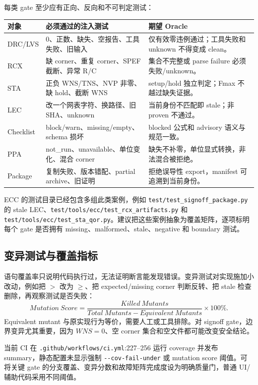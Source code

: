 \documentclass[UTF8,a4paper,11pt,fontset=fandol]{ctexart}
\numberwithin{equation}{section}
\newcommand{\code}[1]{\nolinkurl{#1}}
\begin{document}
每类 gate 至少应有正向、反向和不可判定测试：
\begin{center}
\begin{tabularx}{\textwidth}{p{}p{}X}
\toprule
对象 & 必须通过的注入测试 & 期望 Oracle \\
\midrule
DRC/LVS & 0、正数、缺失、空报告、工具失败、旧输入 & 仅有效零违例通过；工具失败和 unknown 不得变成 clean。 \\
RCX & 缺 corner、重复 corner、SPEF 截断、异常 R/C & 集合不完整或 parse failure 必须失败/unknown。 \\
STA & 正负 WNS/TNS、NVP 非零、缺 hold、截断 WNS & setup/hold 独立判定；Fmax 不越过缺失证据。 \\
LEC & 改一个网表字符、换路径、旧 SHA、unknown & 当前身份不匹配即 stale；非 proven 不通过。 \\
Checklist & block/warn、missing/empty、schema 损坏 & blocked 公式和 advisory 语义与规范一致。 \\
PPA & not\_run、unavailable、单位变化、混合 corner & 缺失不补零，单位显式转换，非法混合被拒绝。 \\
Package & 复制失败、版本错配、partial archive、旧证明 & 拒绝误导性 export，manifest 可追溯到当前身份。 \\
\bottomrule
\end{tabularx}
\end{center}

ECC 的测试目录已经包含多组此类案例，例如 \code{test/test_signoff_package.py} 的 stale LEC、\code{test/tools/ecc/test_rcx_artifacts.py} 和 \code{test/tools/ecc/test_sta_qor.py}。建议把这些案例抽象为覆盖矩阵，逐项标明每个 gate 是否拥有 missing、malformed、stale、negative 和 boundary 测试。

\subsection{变异测试与覆盖指标}

语句覆盖率只说明代码执行过，无法证明断言能发现错误。变异测试对实现施加小改动，例如把 $>$ 改为 $\ge$、把 expected/missing corner 判断反转、把 stale 检查删除，再观察测试是否失败：
\begin{equation}
Mutation\ Score=\frac{Killed\ Mutants}
{Total\ Mutants-Equivalent\ Mutants}\times100\%.
\end{equation}
Equivalent mutant 与原实现行为等价，需要人工或工具排除\cite{testing}。对 signoff gate，边界变异尤其重要，因为 $WNS=0$、空 corner 集合和空文件都可能改变安全结论。

当前 CI 在 \code{.github/workflows/ci.yml}:227--256 运行 coverage 并发布 summary，静态配置未显示强制 \code{--cov-fail-under} 或 mutation score 阈值。可将关键 gate 的分支覆盖、变异分数和故障矩阵完成度设为明确质量门，普通 UI/辅助代码采用不同阈值。
\end{document}
